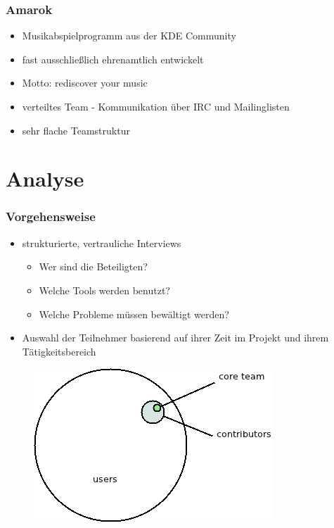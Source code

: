 \documentclass{beamer}
\begin{document}
\begin{frame}
\frametitle{Amarok}
\begin{itemize}
 \item Musikabspielprogramm aus der KDE Community
 \item fast ausschlie\ss lich ehrenamtlich entwickelt
 \item Motto: rediscover your music
 \item verteiltes Team - Kommunikation \"uber IRC und Mailinglisten
 \item sehr flache Teamstruktur
\end{itemize}
\end{frame}

\section{Analyse}

\begin{frame}
\frametitle{Vorgehensweise}
\begin{itemize}
 \item strukturierte, vertrauliche Interviews
     \begin{itemize}
        \item Wer sind die Beteiligten?
        \item Welche Tools werden benutzt?
        \item Welche Probleme m\"ussen bew\"altigt werden?
     \end{itemize}
 \item Auswahl der Teilnehmer basierend auf ihrer Zeit im Projekt und ihrem T\"atigkeitsbereich
\end{itemize}
\begin{figure}[h!]
 \centering
 \includegraphics[scale=0.35,keepaspectratio=true]{./communitymodel.png}
\end{figure}
\end{frame}
\end{document}
